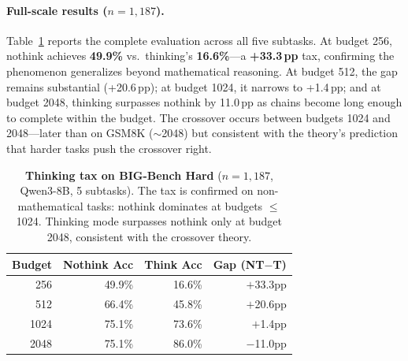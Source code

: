 \paragraph{Full-scale results ($n{=}1{,}187$).}
Table~\ref{tab:bbh-full} reports the complete evaluation across all five subtasks.
At budget 256, nothink achieves \textbf{49.9\%} vs.\ thinking's \textbf{16.6\%}---a
\textbf{+33.3\,pp} tax, confirming the phenomenon generalizes beyond mathematical reasoning.
At budget 512, the gap remains substantial (+20.6\,pp); at budget 1024, it narrows
to +1.4\,pp; and at budget 2048, thinking surpasses nothink by 11.0\,pp as chains
become long enough to complete within the budget.
The crossover occurs between budgets 1024 and 2048---later than on GSM8K (${\sim}$2048)
but consistent with the theory's prediction that harder tasks push the crossover right.

\begin{table}[ht]
\centering
\small
\caption{\textbf{Thinking tax on BIG-Bench Hard} ($n{=}1{,}187$, Qwen3-8B, 5 subtasks).
The tax is confirmed on non-mathematical tasks: nothink dominates at budgets $\leq$1024.
Thinking mode surpasses nothink only at budget 2048, consistent with the crossover theory.}
\label{tab:bbh-full}
\begin{tabular}{rrrr}
\toprule
\textbf{Budget} & \textbf{Nothink Acc} & \textbf{Think Acc} & \textbf{Gap (NT$-$T)} \\
\midrule
256 & 49.9\% & 16.6\% & $+$33.3pp \\
512 & 66.4\% & 45.8\% & $+$20.6pp \\
1024 & 75.1\% & 73.6\% & $+$1.4pp \\
2048 & 75.1\% & 86.0\% & $-$11.0pp \\
\bottomrule
\end{tabular}
\end{table}

